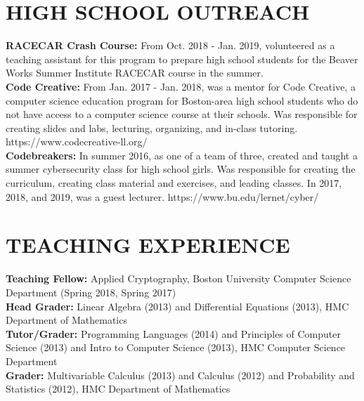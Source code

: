 \documentclass{res}
\begin{document}
\begin{resume}
\vspace{0.25in}

\section{HIGH SCHOOL OUTREACH}
\vspace{0.1in}

\textbf{RACECAR Crash Course:} From Oct. 2018 - Jan. 2019, volunteered as a teaching assistant for
this program to prepare high school students for the Beaver Works Summer Institute RACECAR course in the summer. \\
\textbf{Code Creative:} From Jan. 2017 - Jan. 2018, was a mentor for Code Creative, a computer science education
program for Boston-area high school students who do not have access to a computer science course at their schools.
Was responsible for creating slides and labs, lecturing, organizing, and in-class tutoring.
https://www.codecreative-ll.org/ \\
\textbf{Codebreakers:} In summer 2016, as one of a team of three, created and taught a summer cybersecurity class for
high school girls.  Was responsible for creating the curriculum, creating class material and exercises, and leading
classes.  In 2017, 2018, and 2019, was a guest lecturer.  https://www.bu.edu/lernet/cyber/ \\


\section{TEACHING EXPERIENCE}
\vspace{0.1in}
\textbf{Teaching Fellow:} Applied Cryptography, Boston University Computer Science Department (Spring 2018, Spring 2017) \\
\textbf{Head Grader:}  Linear Algebra (2013) and 
Differential Equations (2013), HMC Department of Mathematics \\
\textbf{Tutor/Grader:} Programming Languages (2014) and Principles of Computer Science (2013) and
Intro to Computer Science (2013), HMC Computer Science Department \\
\textbf{Grader:}  Multivariable Calculus (2013) and Calculus (2012) and Probability and Statistics
(2012), HMC Department of Mathematics \\




\end{resume}
\end{document}
